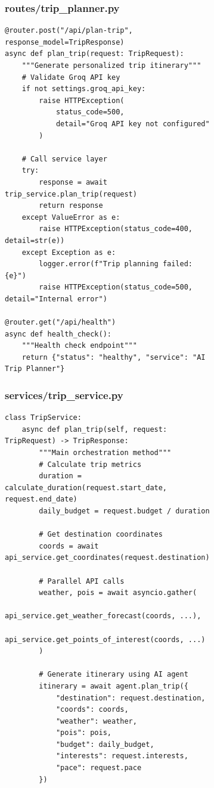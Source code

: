 \documentclass[12pt,a4paper]{report}
\begin{document}
\begin{figure}[H]
\begin{plantuml}
\begin{figure}[H]
\begin{plantuml}
\subsubsection{routes/trip\_planner.py}

\begin{lstlisting}[style=pythonstyle, caption={API Route Definitions}]
@router.post("/api/plan-trip", response_model=TripResponse)
async def plan_trip(request: TripRequest):
    """Generate personalized trip itinerary"""
    # Validate Groq API key
    if not settings.groq_api_key:
        raise HTTPException(
            status_code=500,
            detail="Groq API key not configured"
        )
    
    # Call service layer
    try:
        response = await trip_service.plan_trip(request)
        return response
    except ValueError as e:
        raise HTTPException(status_code=400, detail=str(e))
    except Exception as e:
        logger.error(f"Trip planning failed: {e}")
        raise HTTPException(status_code=500, detail="Internal error")

@router.get("/api/health")
async def health_check():
    """Health check endpoint"""
    return {"status": "healthy", "service": "AI Trip Planner"}
\end{lstlisting}

\subsubsection{services/trip\_service.py}

\begin{lstlisting}[style=pythonstyle, caption={Trip Service Orchestration}]
class TripService:
    async def plan_trip(self, request: TripRequest) -> TripResponse:
        """Main orchestration method"""
        # Calculate trip metrics
        duration = calculate_duration(request.start_date, request.end_date)
        daily_budget = request.budget / duration
        
        # Get destination coordinates
        coords = await api_service.get_coordinates(request.destination)
        
        # Parallel API calls
        weather, pois = await asyncio.gather(
            api_service.get_weather_forecast(coords, ...),
            api_service.get_points_of_interest(coords, ...)
        )
        
        # Generate itinerary using AI agent
        itinerary = await agent.plan_trip({
            "destination": request.destination,
            "coords": coords,
            "weather": weather,
            "pois": pois,
            "budget": daily_budget,
            "interests": request.interests,
            "pace": request.pace
        })
        

\end{lstlisting}
\end{plantuml}
\end{figure}
\end{plantuml}
\end{figure}
\end{document}

